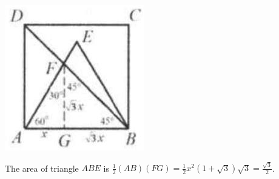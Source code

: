 \documentclass{article}
\begin{document}
\begin{center}
\includegraphics[width=\textwidth]{images/reasoning_image_1.jpg}
\end{center}

The area of triangle \(A B E\) is \(\frac{1}{2}(A B)(F G)=\frac{1}{2} x^{2}(1+\sqrt{3}) \sqrt{3}=\frac{\sqrt{3}}{2}\).\\
\end{document}
